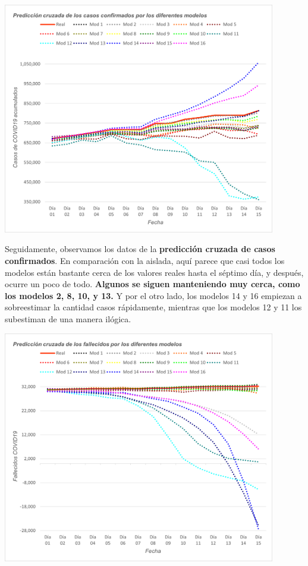 \documentclass[12pt,a4paper, xcolor=table]{article}
\begin{document}
            \begin{center}
                \centering
                \includegraphics[width=450px]{img/pred_c_conf_ES.png}
            \end{center}
            
            Seguidamente, observamos los datos de la \textbf{predicción cruzada de casos confirmados}. En comparación con la aislada, aquí parece que casi todos los modelos están bastante cerca de los valores reales hasta el séptimo día, y después, ocurre un poco de todo. \textbf{Algunos se siguen manteniendo muy cerca, como los modelos 2, 8, 10, y 13.} Y por el otro lado, los modelos 14 y 16 empiezan a sobreestimar la cantidad casos rápidamente, mientras que los modelos 12 y 11 los subestiman de una manera ilógica.
            
            \begin{center}
                \centering
                \includegraphics[width=450px]{img/pred_c_fall_ES.png}
            \end{center}
            
\end{document}
